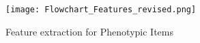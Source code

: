 \documentclass{sig-alternate}
\begin{document}
%


\begin{figure} [t]
\centering
\texttt{[image: Flowchart\_Features\_revised.png]}
\caption{Feature extraction for Phenotypic Items}
\label{fig:feature-extract}
\end{figure}
\end{document}
